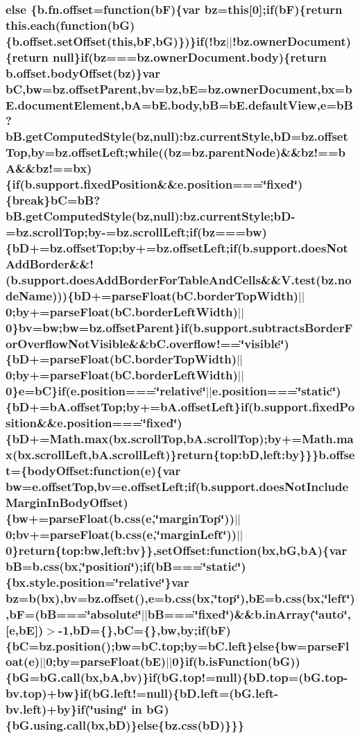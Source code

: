 \subsubsection[{else}]{\setlength{\rightskip}{0pt plus 5cm}else \{b.\-fn.\-offset=function(b\-F)\{var bz=this[0];{\bf if}(b\-F)\{return {\bf this.\-each}(function(b\-G)\{b.\-offset.\-set\-Offset(this,b\-F,b\-G)\})\}{\bf if}(!bz$\vert$$\vert$!bz.\-owner\-Document)\{return null\}{\bf if}(bz===bz.\-owner\-Document.\-body)\{return b.\-offset.\-body\-Offset(bz)\}var b\-C,bw=bz.\-offset\-Parent,bv=bz,b\-E=bz.\-owner\-Document,bx=b\-E.\-document\-Element,b\-A=b\-E.\-body,b\-B=b\-E.\-default\-View,e=b\-B?b\-B.\-get\-Computed\-Style(bz,null)\-:bz.\-current\-Style,b\-D=bz.\-offset\-Top,by=bz.\-offset\-Left;while((bz=bz.\-parent\-Node)\&\&bz!==b\-A\&\&bz!==bx)\{{\bf if}(b.\-support.\-fixed\-Position\&\&e.\-position===\char`\"{}fixed\char`\"{})\{break\}b\-C=b\-B?b\-B.\-get\-Computed\-Style(bz,null)\-:bz.\-current\-Style;b\-D-\/=bz.\-scroll\-Top;by-\/=bz.\-scroll\-Left;{\bf if}(bz===bw)\{b\-D+=bz.\-offset\-Top;by+=bz.\-offset\-Left;{\bf if}(b.\-support.\-does\-Not\-Add\-Border\&\&!(b.\-support.\-does\-Add\-Border\-For\-Table\-And\-Cells\&\&V.\-test(bz.\-node\-Name)))\{b\-D+=parse\-Float(b\-C.\-border\-Top\-Width)$\vert$$\vert$0;by+=parse\-Float(b\-C.\-border\-Left\-Width)$\vert$$\vert$0\}bv=bw;bw=bz.\-offset\-Parent\}{\bf if}(b.\-support.\-subtracts\-Border\-For\-Overflow\-Not\-Visible\&\&b\-C.\-overflow!==\char`\"{}visible\char`\"{})\{b\-D+=parse\-Float(b\-C.\-border\-Top\-Width)$\vert$$\vert$0;by+=parse\-Float(b\-C.\-border\-Left\-Width)$\vert$$\vert$0\}e=b\-C\}{\bf if}(e.\-position===\char`\"{}relative\char`\"{}$\vert$$\vert$e.\-position===\char`\"{}static\char`\"{})\{b\-D+=b\-A.\-offset\-Top;by+=b\-A.\-offset\-Left\}{\bf if}(b.\-support.\-fixed\-Position\&\&e.\-position===\char`\"{}fixed\char`\"{})\{b\-D+=Math.\-max(bx.\-scroll\-Top,b\-A.\-scroll\-Top);by+=Math.\-max(bx.\-scroll\-Left,b\-A.\-scroll\-Left)\}return\{top\-:b\-D,left\-:by\}\}\}b.\-offset=\{body\-Offset\-:function(e)\{var bw=e.\-offset\-Top,bv=e.\-offset\-Left;{\bf if}(b.\-support.\-does\-Not\-Include\-Margin\-In\-Body\-Offset)\{bw+=parse\-Float({\bf b.\-css}(e,\char`\"{}margin\-Top\char`\"{}))$\vert$$\vert$0;bv+=parse\-Float({\bf b.\-css}(e,\char`\"{}margin\-Left\char`\"{}))$\vert$$\vert$0\}return\{top\-:bw,left\-:bv\}\},set\-Offset\-:function(bx,b\-G,b\-A)\{var b\-B={\bf b.\-css}(bx,\char`\"{}position\char`\"{});if(b\-B===\char`\"{}static\char`\"{})\{bx.\-style.\-position=\char`\"{}relative\char`\"{}\}var bz={\bf b}(bx),bv=bz.\-offset(),e={\bf b.\-css}(bx,\char`\"{}top\char`\"{}),b\-E={\bf b.\-css}(bx,\char`\"{}left\char`\"{}),b\-F=(b\-B===\char`\"{}absolute\char`\"{}$\vert$$\vert$b\-B===\char`\"{}fixed\char`\"{})\&\&b.\-in\-Array(\char`\"{}auto\char`\"{},[e,b\-E])$>$-\/1,b\-D=\{\},b\-C=\{\},bw,by;{\bf if}(b\-F)\{b\-C=bz.\-position();bw=b\-C.\-top;by=b\-C.\-left\}else\{bw=parse\-Float(e)$\vert$$\vert$0;by=parse\-Float(b\-E)$\vert$$\vert$0\}{\bf if}(b.\-is\-Function(b\-G))\{b\-G=b\-G.\-call(bx,b\-A,bv)\}{\bf if}(b\-G.\-top!=null)\{b\-D.\-top=(b\-G.\-top-\/bv.\-top)+bw\}{\bf if}(b\-G.\-left!=null)\{b\-D.\-left=(b\-G.\-left-\/bv.\-left)+by\}{\bf if}(\char`\"{}using\char`\"{} in b\-G)\{b\-G.\-using.\-call(bx,b\-D)\}else\{{\bf bz.\-css}(b\-D)\}\}\}}\label{data_structures_2html_2jquery_8js_a0544c3fe466e421738dae463968b70ba}
